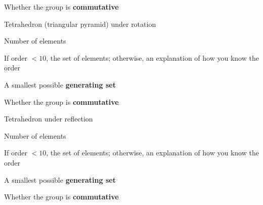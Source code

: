 \documentclass[../gatm_answers.tex]{subfiles}
\begin{document}
\begin{inner_problem}
\item Whether the group is \textbf{commutative}
\end{inner_problem}

\begin{outer_problem}
\item Tetrahedron (triangular pyramid) under rotation
\end{outer_problem}

\begin{inner_problem}[start=1]
\item Number of elements
\end{inner_problem}

\begin{inner_problem}
\item If order $< 10$, the set of elements; otherwise, an explanation of how you know the order
\end{inner_problem}

\begin{inner_problem}
\item A smallest possible \textbf{generating set}
\end{inner_problem}

\begin{inner_problem}
\item Whether the group is \textbf{commutative}
\end{inner_problem}

\begin{outer_problem}
\item Tetrahedron under reflection
\end{outer_problem}

\begin{inner_problem}[start=1]
\item Number of elements
\end{inner_problem}

\begin{inner_problem}
\item If order $< 10$, the set of elements; otherwise, an explanation of how you know the order
\end{inner_problem}

\begin{inner_problem}
\item A smallest possible \textbf{generating set}
\end{inner_problem}

\begin{inner_problem}
\item Whether the group is \textbf{commutative}
\end{inner_problem}
\end{document}
